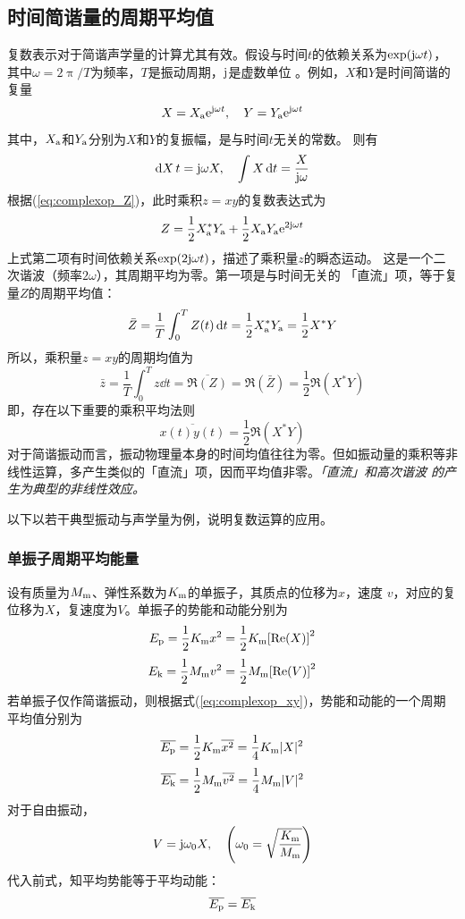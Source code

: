 \documentclass[UTF8]{ctexbook}
\begin{document}
\subsection{时间简谐量的周期平均值}
复数表示对于简谐声学量的计算尤其有效。假设与时间$t$的依赖关系为$\exp(\mathrm{j} 
\omega t)$，其中$\omega = 2\uppi /T$为频率，$T$是振动周期，$\mathrm{j}$是虚数单位
。例如，$X$和$Y$是时间简谐的复量
$$X=X\st{a} \me^{\mj \omega t }\qc Y = Y\st{a}\me^{\mj \omega t}$$
其中，$X_\text{a}$和$Y_\text{a}$分别为$X$和$Y$的复振幅，是与时间$t$无关的常数。
则有
$$\dd{X}{t}=\mj \omega X\qc \int X\dd{t} = \frac{X}{\mj \omega}$$
根据(\ref{eq:complexop_Z})，此时乘积$z=xy$的复数表达式为
$$Z=\frac12 X_\text{a}^* Y_\text{a}+\frac12 X_\text{a}Y_\text{a}\mathrm{e}^{2\mathrm{j} \omega t}$$
上式第二项有时间依赖关系$\exp(2\mathrm{j} \omega  t)$，描述了乘积量$z$的瞬态运动。
这是一个二次谐波（频率$2\omega$），其周期平均为零。第一项是与时间无关的
「直流」项，等于复量$Z$的周期平均值：
$$\bar{Z} = \frac1T \int_0^T Z(t) \dd{t} = \frac12 X_\text{a}^* Y_\text{a} =
\frac12 X^* Y$$
所以，乘积量$z=xy$的周期均值为
$$\bar{z}=\frac1T \int_0^T z\dd{t} = \overline{\Re(Z)} = \Re(\bar{Z})
=\frac12\Re(X^*Y)$$
即，存在以下重要的乘积平均法则
\begin{equation}
	\overline{x(t)y(t)} = \frac12 \Re(X^*Y) \label{eq:complexop_xy}
\end{equation}
对于简谐振动而言，振动物理量本身的时间均值往往为零。但如振动量的乘积等非
线性运算，多产生类似的「直流」项，因而平均值非零。\emph{「直流」和高次谐波
的产生为典型的非线性效应。}

以下以若干典型振动与声学量为例，说明复数运算的应用。

\subsubsection{单振子周期平均能量}
设有质量为$M_\text{m}$、弹性系数为$K_\text{m}$的单振子，其质点的位移为$x$，速度
$v$，对应的复位移为$X$，复速度为$V$。单振子的势能和动能分别为
$$E_\text{p} = \frac12 K_\text{m} x^2 = \frac12 K_\text{m}\qty[\Re(X)]^2$$
$$E_\text{k} = \frac12 M_\text{m} v^2 = \frac12 M_\text{m} \qty[\Re(V)]^2$$
若单振子仅作简谐振动，则根据式(\ref{eq:complexop_xy})，势能和动能的一个周期
平均值分别为
$$\overline{E_\text{p}} = \frac12 K_\text{m} \overline{x^2} = \frac14 K_\text{m}
|X|^2$$
$$\overline{E_\text{k}} = \frac12 M_\text{m} \overline{v^2} = \frac14 M_\text{m}
|V|^2$$
对于自由振动，
$$V = \mj \omega_0 X\qc \qty(\omega_0 = \sqrt{\frac{K\st{m}}{M\st{m}}})$$
代入前式，知平均势能等于平均动能：
$$\overline{E_\text{p}} = \overline{E_\text{k}}$$
\end{document}

